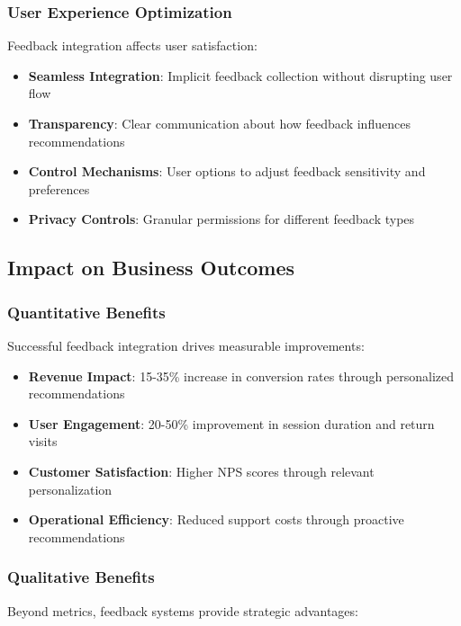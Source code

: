 \subsubsection{User Experience Optimization}

Feedback integration affects user satisfaction:

\begin{itemize}
    \item \textbf{Seamless Integration}: Implicit feedback collection without disrupting user flow
    \item \textbf{Transparency}: Clear communication about how feedback influences recommendations
    \item \textbf{Control Mechanisms}: User options to adjust feedback sensitivity and preferences
    \item \textbf{Privacy Controls}: Granular permissions for different feedback types
\end{itemize}

\subsection{Impact on Business Outcomes}

\subsubsection{Quantitative Benefits}

Successful feedback integration drives measurable improvements:

\begin{itemize}
    \item \textbf{Revenue Impact}: 15-35\% increase in conversion rates through personalized recommendations
    \item \textbf{User Engagement}: 20-50\% improvement in session duration and return visits
    \item \textbf{Customer Satisfaction}: Higher NPS scores through relevant personalization
    \item \textbf{Operational Efficiency}: Reduced support costs through proactive recommendations
\end{itemize}

\subsubsection{Qualitative Benefits}

Beyond metrics, feedback systems provide strategic advantages:

